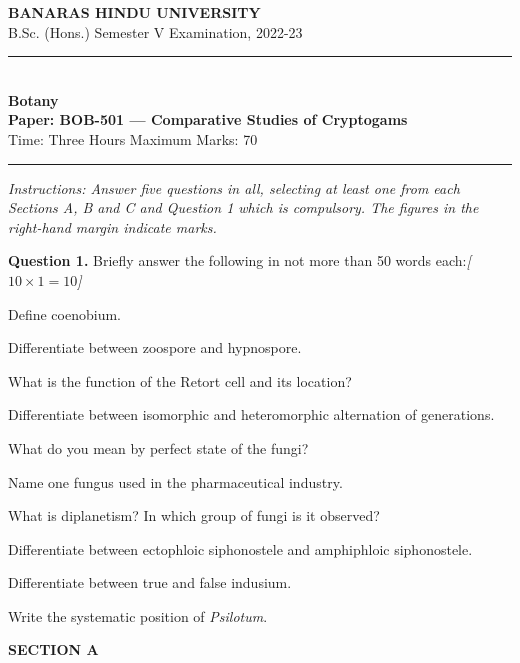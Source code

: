 \documentclass[11pt,a4paper]{article}
\newcommand{\pts}[1]{\hfill   \textit{[#1]}}
\begin{document}
\begin{center}
  {\large\bfseries BANARAS HINDU UNIVERSITY}\\[2pt]
  {\normalsize B.Sc. (Hons.) Semester V Examination, 2022-23}\\[6pt]
  \rule{0.8\linewidth}{0.5pt}\\[6pt]
  {\large\bfseries Botany}\\[4pt]
  {\large\bfseries Paper: BOB-501 --- Comparative Studies of Cryptogams}\\[4pt]
  {\normalsize Time: Three Hours \hfill Maximum Marks: 70}
\end{center}

\rule{\linewidth}{0.4pt}

\smallskip



\noindent   \textit{Instructions: Answer five questions in all, selecting at least one from each Sections A, B and C and Question 1 which is compulsory. The figures in the right-hand margin indicate marks.}

\bigskip

\medskip


\noindent   \textbf{Question 1.} Briefly answer the following in not more than 50 words each:\pts{$10  \times 1 = 10$}

\begin{parts}
  \item Define coenobium.
  \item Differentiate between zoospore and hypnospore.
  \item What is the function of the Retort cell and its location?
  \item Differentiate between isomorphic and heteromorphic alternation of generations.
  \item What do you mean by perfect state of the fungi?
  \item Name one fungus used in the pharmaceutical industry.
  \item What is diplanetism? In which group of fungi is it observed?
  \item Differentiate between ectophloic siphonostele and amphiphloic siphonostele.
  \item Differentiate between true and false indusium.
  \item Write the systematic position of   \textit{Psilotum}.
\end{parts}

\bigskip

\begin{center}
   \textbf{SECTION A}
\end{center}
\medskip
\end{document}
